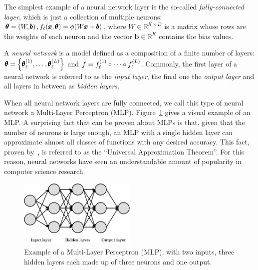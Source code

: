 The simplest example of a neural network layer is the so-called \emph{fully-connected layer}, which is just a collection of multiple neurons: $\pmb{\theta}=\mathopen{}\left(W, \pmb{b}\right), f_{\ell}\mathopen{}\left(\pmb{x}, \pmb{\theta}\right) = \phi\mathopen{}\left(W\pmb{x} + \pmb{b}\right)$, where $W \in \mathbb{R}^{K \times D}$ is a matrix whose rows are the weights of each neuron and the vector $\pmb{b} \in \mathbb{R}^K$ contains the bias values.

\begin{definition}
A \emph{neural network} is a model defined as a composition of a finite number of layers: $\pmb{\theta}=\mathopen{}\left\{\pmb{\theta}_{\ell}^{\mathopen{}\left(1\right)},\dots,\pmb{\theta}_{\ell}^{\mathopen{}\left(L\right)}\right\}$ and $f = f_{\ell}^{\mathopen{}\left(1\right)} \circ \dots \circ f_{\ell}^{\mathopen{}\left(L\right)}$. Commonly, the first layer of a neural network is referred to as the \emph{input layer}, the final one the \emph{output layer} and all layers in between as \emph{hidden layers}. 
\end{definition}

When all neural network layers are fully connected, we call this type of neural network a Multi-Layer Perceptron (MLP). Figure~\ref{fig:mlp_example} gives a visual example of an MLP. A surprising fact that can be proven about MLPs is that, given that the number of neurons is large enough, an MLP with a single hidden layer can approximate almost all classes of functions with any desired accuracy. This fact, proven by~\cite{hornik_multilayer_1989}, is referred to as the \enquote{Universal Approximation Theorem}. For this reason, neural networks have seen an understandable amount of popularity in computer science research.

\begin{figure}[H]
\centering
\includegraphics[width=0.5\textwidth]{figures/background/mlp_example}
\caption[Example of a Multi-Layer Perceptron (MLP).]{Example of a Multi-Layer Perceptron (MLP), with two inputs, three hidden layers each made up of three neurons and one output.}
\label{fig:mlp_example}
\end{figure}

